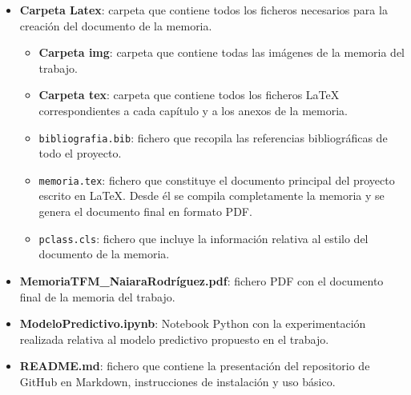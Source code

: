 \begin{itemize}
    \item \textbf{Carpeta Latex}: carpeta que contiene todos los ficheros necesarios para la creación del documento de la memoria.
    \begin{itemize}
        \item \textbf{Carpeta img}: carpeta que contiene todas las imágenes de la memoria del trabajo.
        \item \textbf{Carpeta tex}: carpeta que contiene todos los ficheros LaTeX correspondientes a cada capítulo y a los anexos de la memoria.
        \item \texttt{bibliografia.bib}: fichero que recopila las referencias bibliográficas de todo el proyecto.
        \item \texttt{memoria.tex}: fichero que constituye el documento principal del proyecto escrito en LaTeX. Desde él se compila completamente la memoria y se genera el documento final en formato PDF.
        \item \texttt{pclass.cls}: fichero que incluye la información relativa al estilo del documento de la memoria.
    \end{itemize}
    
    \item \textbf{MemoriaTFM\_NaiaraRodríguez.pdf}: fichero PDF con el documento final de la memoria del trabajo.
    \item \textbf{ModeloPredictivo.ipynb}: Notebook Python con la experimentación realizada relativa al modelo predictivo propuesto en el trabajo.
    \item \textbf{README.md}: fichero que contiene la presentación del repositorio de GitHub en Markdown, instrucciones de instalación y uso básico.
\end{itemize}
